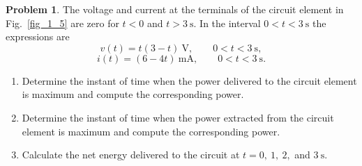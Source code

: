 \documentclass[11pt,letterpaper]{article}
\theoremstyle{definition}
\newtheorem{prob}{\textcolor{problemcolor}{Problem}}  %
\begin{document}
\begin{prob}\label{pb:p5}
	The voltage and current at the terminals of the circuit element in Fig.~\ref{fig_1_5} are zero for $t<0$ and $t>3\ \mathrm{s}$. In the interval $0<t<3\ \mathrm{s}$ the expressions are
	\[
	v(t)=t(3-t)\ \mathrm{V},\qquad 0<t<3\ \mathrm{s},
	\]
	\[
	i(t)=(6-4t)\ \mathrm{mA},\qquad 0<t<3\ \mathrm{s}.
	\]
\begin{enumerate}[label=(\alph*)]
	\item Determine the instant of time when the power delivered to the circuit element is maximum and compute the corresponding power.
	\item Determine the instant of time when the power extracted from the circuit element is maximum and compute the corresponding power.
	\item Calculate the net energy delivered to the circuit at $t=0,\ 1,\ 2,$ and $3\ \mathrm{s}$.
\end{enumerate}
\end{prob}



\noindent\makebox[\linewidth]{\color{rouge_poly}{\rule{\textwidth}{1.3pt}}}
\end{document}
